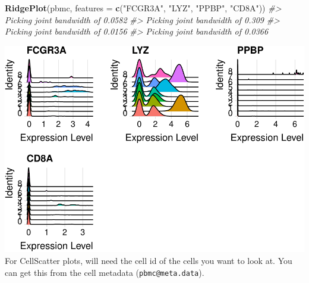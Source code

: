 \documentclass[
]{book}
\newenvironment{Shaded}{\begin{snugshade}}{\end{snugshade}}
\newcommand{\AttributeTok}[1]{\textcolor[rgb]{0.13,0.29,0.53}{#1}}
\newcommand{\CommentTok}[1]{\textcolor[rgb]{0.56,0.35,0.01}{\textit{#1}}}
\newcommand{\FunctionTok}[1]{\textcolor[rgb]{0.13,0.29,0.53}{\textbf{#1}}}
\newcommand{\NormalTok}[1]{#1}
\newcommand{\StringTok}[1]{\textcolor[rgb]{0.31,0.60,0.02}{#1}}
\begin{document}
\begin{Shaded}
\begin{Highlighting}[]
\FunctionTok{RidgePlot}\NormalTok{(pbmc, }\AttributeTok{features =} \FunctionTok{c}\NormalTok{(}\StringTok{"FCGR3A"}\NormalTok{, }\StringTok{"LYZ"}\NormalTok{, }\StringTok{"PPBP"}\NormalTok{, }\StringTok{"CD8A"}\NormalTok{))}
\CommentTok{\#\textgreater{} Picking joint bandwidth of 0.0582}
\CommentTok{\#\textgreater{} Picking joint bandwidth of 0.309}
\CommentTok{\#\textgreater{} Picking joint bandwidth of 0.0156}
\CommentTok{\#\textgreater{} Picking joint bandwidth of 0.0366}
\end{Highlighting}
\end{Shaded}

\includegraphics{scRNAseqInR_Doco_files/figure-latex/ridgeplots-2.pdf}
For CellScatter plots, will need the cell id of the cells you want to look at. You can get this from the cell metadata (\texttt{pbmc@meta.data}).
\end{document}
